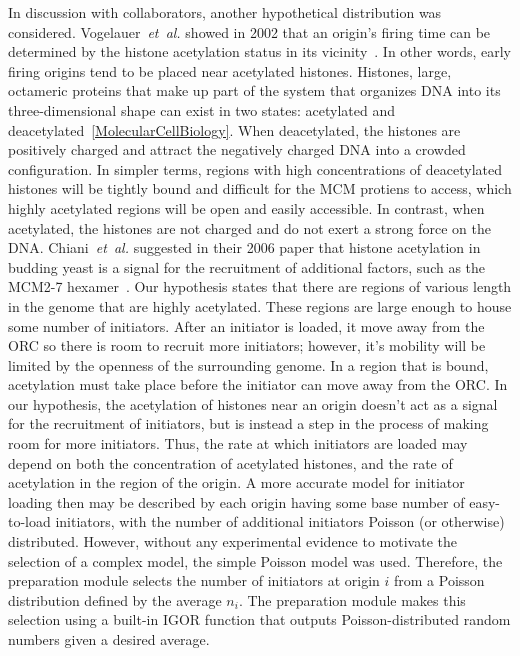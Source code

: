 		In discussion with collaborators, another hypothetical distribution was considered.
		Vogelauer~\emph{et~al.} showed in 2002 that an origin's firing time can be determined by the histone acetylation status in its vicinity~\cite{Histone}.
		In other words, early firing origins tend to be placed near acetylated histones.
		Histones, large, octameric proteins that make up part of the system that organizes DNA into its three-dimensional shape can exist in two states: acetylated and deacetylated~\ref{MolecularCellBiology}.
		When deacetylated, the histones are positively charged and attract the negatively charged DNA into a crowded configuration.
		In simpler terms, regions with high concentrations of deacetylated histones will be tightly bound and difficult for the MCM protiens to access, which highly acetylated regions will be open and easily accessible.
		In contrast, when acetylated, the histones are not charged and do not exert a strong force on the DNA.
		Chiani~\emph{et~al.} suggested in their 2006 paper that histone acetylation in budding yeast is a signal for the recruitment of additional factors, such as the MCM2-7 hexamer~\cite{histone2}.
		Our hypothesis states that there are regions of various length in the genome that are highly acetylated. These regions are large enough to house some number of initiators.
		After an initiator is loaded, it move away from the ORC so there is room to recruit more initiators; however, it's mobility will be limited by the openness of the surrounding genome.
		In a region that is bound, acetylation must take place before the initiator can move away from the ORC.
		In our hypothesis, the acetylation of histones near an origin doesn't act as a signal for the recruitment of initiators, but is instead a step in the process of making room for more initiators.
		Thus, the rate at which initiators are loaded may depend on both the concentration of acetylated histones, and the rate of acetylation in the region of the origin.
		A more accurate model for initiator loading then may be described by each origin having some base number of easy-to-load initiators, with the number of additional initiators Poisson (or otherwise) distributed.
		However, without any experimental evidence to motivate the selection of a complex model, the simple Poisson model was used.
		Therefore, the preparation module selects the number of initiators at origin $i$ from a Poisson distribution defined by the average $n_i$.
		The preparation module makes this selection using a built-in IGOR function that outputs Poisson-distributed random numbers given a desired average.
		
